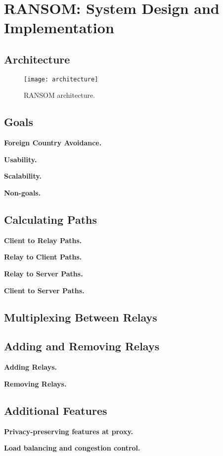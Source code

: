\section{RANSOM: System Design and Implementation}

\subsection{Architecture}


\begin{figure}[t]
\centering
\texttt{[image: architecture]}
\caption{RANSOM architecture.}
\label{fig:arch}
\end{figure}

\subsection{Goals}

{\bf Foreign Country Avoidance.}

{\bf Usability.}

{\bf Scalability.}

{\bf Non-goals.}  

\subsection{Calculating Paths}

{\bf Client to Relay Paths.}

{\bf Relay to Client Paths.}

{\bf Relay to Server Paths.}

{\bf Client to Server Paths.}


\subsection{Multiplexing Between Relays}


\subsection{Adding and Removing Relays}

{\bf Adding Relays.}

{\bf Removing Relays.}

\subsection{Additional Features}

{\bf Privacy-preserving features at proxy.}

{\bf Load balancing and congestion control.}
